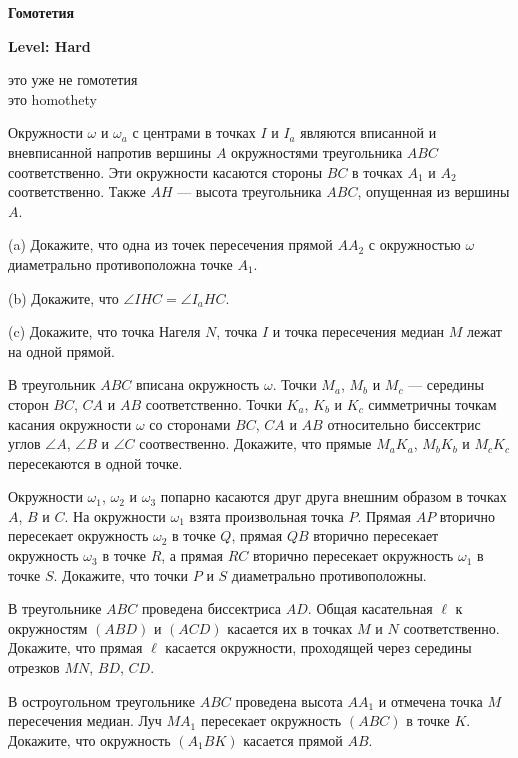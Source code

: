 \centerline{\bf \Huge Гомотетия}
\centerline{\bf \Huge Level: Hard}

\begin{flushright}
        \scriptsize{это уже не гомотетия\\ это homothety}
\end{flushright}

Окружности $\omega$ и $\omega_a$ с центрами в точках $I$ и $I_a$
являются вписанной и вневписанной напротив вершины $A$ окружностями
треугольника $ABC$ соответственно. Эти окружности касаются стороны $BC$
в точках $A_1$ и $A_2$ соответственно. Также $AH$ — высота треугольника
$ABC$, опущенная из вершины $A$.\

(a) Докажите, что одна из точек пересечения прямой $AA_2$ с окружностью
$\omega$ диаметрально противоположна точке $A_1$.\

(b) Докажите, что $\angle IHC=\angle I_aHC$.\

(c) Докажите, что точка Нагеля $N$, точка $I$ и точка пересечения медиан $M$
лежат на одной прямой.

В треугольник $ABC$ вписана окружность $\omega$. Точки $M_a$, $M_b$ и
$M_c$ — середины сторон $BC$, $CA$ и $AB$ соответственно. Точки $K_a$,
$K_b$ и $K_c$ симметричны точкам касания окружности $\omega$ со
сторонами $BC$, $CA$ и $AB$ относительно биссектрис углов $\angle A$,
$\angle B$ и $\angle C$ соотвественно. Докажите, что прямые $M_aK_a$,
$M_bK_b$ и $M_cK_c$ пересекаются в одной точке.

Окружности $\omega_1$, $\omega_2$ и $\omega_3$ попарно касаются друг
друга внешним образом в точках $A$, $B$ и $C$. На окружности $\omega_1$
взята произвольная точка $P$. Прямая $AP$ вторично пересекает окружность
$\omega_2$ в точке $Q$, прямая $QB$ вторично пересекает окружность
$\omega_3$ в точке $R$, а прямая $RC$ вторично пересекает окружность
$\omega_1$ в точке $S$. Докажите, что точки $P$ и $S$ диаметрально
противоположны.

В треугольнике $ABC$ проведена биссектриса $AD$. Общая касательная
$\ell$ к окружностям $(ABD)$ и $(ACD)$ касается их в точках $M$ и $N$
соответственно. Докажите, что прямая $\ell$ касается окружности,
проходящей через середины отрезков $MN$, $BD$, $CD$.

В остроугольном треугольнике $ABC$ проведена высота $AA_1$ и отмечена
точка $M$ пересечения медиан. Луч $MA_1$ пересекает окружность $(ABC)$ в
точке $K$. Докажите, что окружность $(A_1BK)$ касается прямой $AB$.


